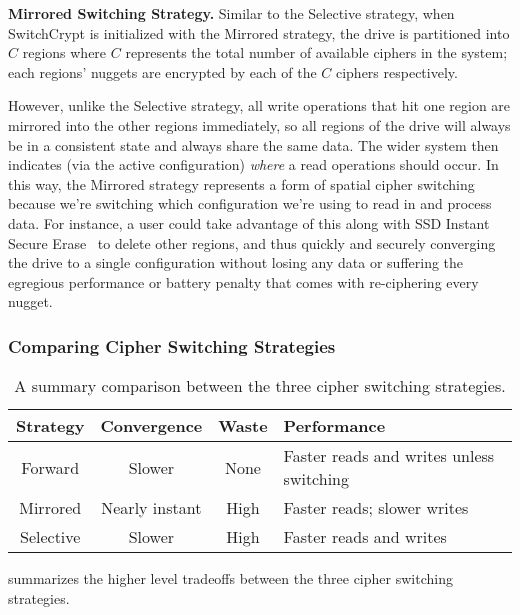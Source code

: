\textbf{Mirrored Switching Strategy.} Similar to the Selective strategy, when
SwitchCrypt is initialized with the Mirrored strategy, the drive is partitioned
into $C$ regions where $C$ represents the total number of available ciphers in
the system; each regions' nuggets are encrypted by each of the $C$ ciphers
respectively.

However, unlike the Selective strategy, all write operations that hit one region
are mirrored into the other regions immediately, so all regions of the drive
will always be in a consistent state and always share the same data. The wider
system then indicates (via the active configuration) \emph{where} a read
operations should occur. In this way, the Mirrored strategy represents a form of
spatial cipher switching because we're switching which configuration we're using
to read in and process data. For instance, a user could take advantage of this
along with SSD Instant Secure Erase~\cite{ISE1,ISE2,ISE3} to delete other
regions, and  thus quickly and securely converging the drive to a single
configuration without losing any data or suffering the egregious performance or
battery penalty that comes with re-ciphering every nugget.

\subsubsection{Comparing Cipher Switching Strategies}

\begin{table}[ht]
   \begin{tabular}{@{}|c|c|c|C{25mm}|@{}}
      \toprule
      \textbf{Strategy} & \textbf{Convergence} & \textbf{Waste} &
      \textbf{Performance} \\
      \midrule
      Forward   & Slower       & None & Faster reads and writes unless switching
      \\\hline
      Mirrored  & Nearly instant & High & Faster reads; slower writes \\
      \hline
      Selective & Slower       & High & Faster reads and writes  \\
      \hline
   \end{tabular}
   \caption{A summary comparison between the three cipher switching strategies.}
   \label{tbl:strategies-advantages}
\end{table}

 summarizes the higher level tradeoffs between the
three cipher switching strategies.

